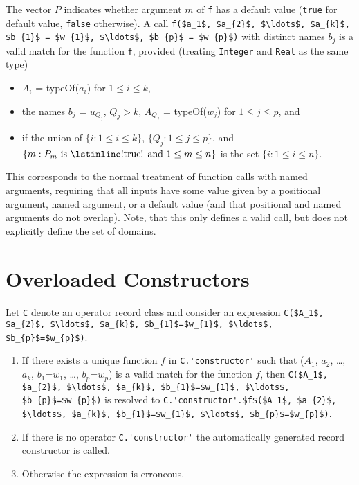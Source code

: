 The vector $P$ indicates whether argument $m$ of \lstinline!f! has a default value (\lstinline!true! for default value, \lstinline!false! otherwise).
A call \lstinline!f($a_1$, $a_{2}$, $\ldots$, $a_{k}$, $b_{1}$ = $w_{1}$, $\ldots$, $b_{p}$ = $w_{p}$)! with distinct names $b_{j}$ is a valid match for the function \lstinline!f!, provided (treating \lstinline!Integer! and \lstinline!Real! as the same type)
\begin{itemize}
\item
  $A_{i}$ = typeOf($a_{i}$) for $1 \leq i \leq k$,
\item
  the names $b_{j}$ = $u_{Q_{j}}$, $Q_{j} > k$, $A_{Q_{j}}$ = typeOf($w_{j}$) for $1 \leq j \leq p$, and
\item
  if the union of $\{i: 1 \leq i \leq k \}$, $\{Q_{j}: 1 \leq j \leq p\}$, and $\{m: P_{m} \text{ is \lstinline!true! and } 1 \leq m \leq n \}$ is the set $\{i: 1 \leq i \leq n\}$.
\end{itemize}

\begin{nonnormative}
This corresponds to the normal treatment of function calls with
named arguments, requiring that all inputs have some value given by a
positional argument, named argument, or a default value (and that
positional and named arguments do not overlap). Note, that this only
defines a valid call, but does not explicitly define the set of
domains.
\end{nonnormative}

\section{Overloaded Constructors}\label{overloaded-constructors}

Let \lstinline!C! denote an operator record class and consider an expression
\lstinline!C($A_1$, $a_{2}$, $\ldots$, $a_{k}$, $b_{1}$=$w_{1}$, $\ldots$, $b_{p}$=$w_{p}$)!.

\begin{enumerate}
\item\label{overloaded-constructor-unique}
  If there exists a unique function $f$ in \lstinline!C.'constructor'! such that
  ($A_1$, $a_{2}$, \ldots{}, $a_{k}$, $b_{1}$=$w_{1}$, \ldots{}, $b_{p}$=$w_{p}$)
  is a valid match for the function $f$, then
  \lstinline!C($A_1$, $a_{2}$, $\ldots$, $a_{k}$, $b_{1}$=$w_{1}$, $\ldots$, $b_{p}$=$w_{p}$)!
  is resolved to
  \lstinline!C.'constructor'.$f$($A_1$, $a_{2}$, $\ldots$, $a_{k}$, $b_{1}$=$w_{1}$, $\ldots$, $b_{p}$=$w_{p}$)!.
\item
  If there is no operator \lstinline!C.'constructor'! the automatically generated record constructor is called.
\item
  Otherwise the expression is erroneous.
\end{enumerate}

